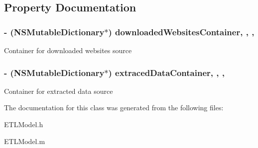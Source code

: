 \subsection{Property Documentation}
\hypertarget{interface_e_t_l_model_a0fa86c2ddfab6f687e8e7e096260c5cb}{
\subsubsection[{downloaded\-Websites\-Container}]{\setlength{\rightskip}{0pt plus 5cm}-\/ (N\-S\-Mutable\-Dictionary$\ast$) downloaded\-Websites\-Container\hspace{0.3cm}{\ttfamily [read]}, {\ttfamily [write]}, {\ttfamily [nonatomic]}, {\ttfamily [strong]}}}\label{interface_e_t_l_model_a0fa86c2ddfab6f687e8e7e096260c5cb}
Container for downloaded websites source \hypertarget{interface_e_t_l_model_a1dec777c4fc38530d5043610595c418c}{
\subsubsection[{extraced\-Data\-Container}]{\setlength{\rightskip}{0pt plus 5cm}-\/ (N\-S\-Mutable\-Dictionary$\ast$) extraced\-Data\-Container\hspace{0.3cm}{\ttfamily [read]}, {\ttfamily [write]}, {\ttfamily [nonatomic]}, {\ttfamily [strong]}}}\label{interface_e_t_l_model_a1dec777c4fc38530d5043610595c418c}
Container for extracted data source 

The documentation for this class was generated from the following files\-:\begin{DoxyCompactItemize}
\item 
E\-T\-L\-Model.\-h\item 
E\-T\-L\-Model.\-m\end{DoxyCompactItemize}
